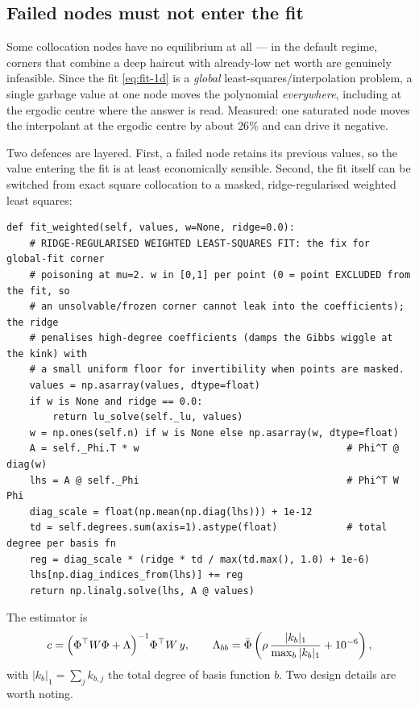 \documentclass[11pt]{article}
\numberwithin{equation}{section}
\newcommand{\code}[1]{\texttt{\small #1}}
\theoremstyle{definition}
\theoremstyle{plain}
\theoremstyle{remark}
\begin{document}
\subsection{Failed nodes must not enter the fit}

Some collocation nodes have no equilibrium at all --- in the default regime, corners
that combine a deep haircut with already-low net worth are genuinely infeasible.
Since the fit \eqref{eq:fit-1d} is a \emph{global} least-squares/interpolation
problem, a single garbage value at one node moves the polynomial \emph{everywhere},
including at the ergodic centre where the answer is read. Measured: one saturated
node moves the interpolant at the ergodic centre by about $26\%$ and can drive it
negative.

Two defences are layered. First, a failed node retains its previous values, so the
value entering the fit is at least economically sensible. Second, the fit itself can
be switched from exact square collocation to a masked, ridge-regularised weighted
least squares:

\begin{lstlisting}[caption={Robust weighted ridge fit. \code{state\_grid.py}, \code{fit\_weighted}.}]
def fit_weighted(self, values, w=None, ridge=0.0):
    # RIDGE-REGULARISED WEIGHTED LEAST-SQUARES FIT: the fix for global-fit corner
    # poisoning at mu=2. w in [0,1] per point (0 = point EXCLUDED from the fit, so
    # an unsolvable/frozen corner cannot leak into the coefficients); the ridge
    # penalises high-degree coefficients (damps the Gibbs wiggle at the kink) with
    # a small uniform floor for invertibility when points are masked.
    values = np.asarray(values, dtype=float)
    if w is None and ridge == 0.0:
        return lu_solve(self._lu, values)
    w = np.ones(self.n) if w is None else np.asarray(w, dtype=float)
    A = self._Phi.T * w                                    # Phi^T @ diag(w)
    lhs = A @ self._Phi                                    # Phi^T W Phi
    diag_scale = float(np.mean(np.diag(lhs))) + 1e-12
    td = self.degrees.sum(axis=1).astype(float)            # total degree per basis fn
    reg = diag_scale * (ridge * td / max(td.max(), 1.0) + 1e-6)
    lhs[np.diag_indices_from(lhs)] += reg
    return np.linalg.solve(lhs, A @ values)
\end{lstlisting}

The estimator is
\begin{equation}
c=\Bigl(\Phi^{\top}W\Phi+\Lambda\Bigr)^{-1}\Phi^{\top}W\,y,
\qquad
\Lambda_{bb}=\bar\Phi\left(\rho\,\frac{|k_b|_1}{\max_b|k_b|_1}+10^{-6}\right),
\label{eq:ridge}
\end{equation}
with $|k_b|_1=\sum_j k_{b,j}$ the total degree of basis function $b$. Two design
details are worth noting.
\end{document}
